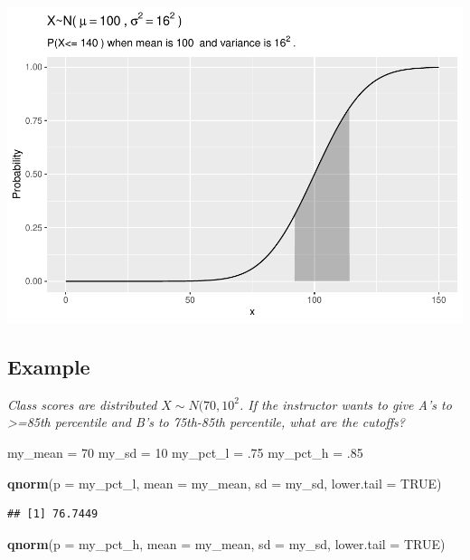 \documentclass[
]{book}
\newenvironment{Shaded}{\begin{snugshade}}{\end{snugshade}}
\newcommand{\DataTypeTok}[1]{\textcolor[rgb]{0.13,0.29,0.53}{#1}}
\newcommand{\DecValTok}[1]{\textcolor[rgb]{0.00,0.00,0.81}{#1}}
\newcommand{\FloatTok}[1]{\textcolor[rgb]{0.00,0.00,0.81}{#1}}
\newcommand{\KeywordTok}[1]{\textcolor[rgb]{0.13,0.29,0.53}{\textbf{#1}}}
\newcommand{\NormalTok}[1]{#1}
\newcommand{\OtherTok}[1]{\textcolor[rgb]{0.56,0.35,0.01}{#1}}
\newcommand{\StringTok}[1]{\textcolor[rgb]{0.31,0.60,0.02}{#1}}
\begin{document}
\includegraphics{data-sci_files/figure-latex/unnamed-chunk-15-1.pdf}

\hypertarget{example-3}{%
\subsection{Example}\label{example-3}}

\emph{Class scores are distributed }\(X \sim N(70, 10^2\)\emph{. If the instructor wants to give A's to \textgreater=85th percentile and B's to 75th-85th percentile, what are the cutoffs?}

\begin{Shaded}
\begin{Highlighting}[]
\NormalTok{my_mean =}\StringTok{ }\DecValTok{70}
\NormalTok{my_sd =}\StringTok{ }\DecValTok{10}
\NormalTok{my_pct_l =}\StringTok{ }\FloatTok{.75}
\NormalTok{my_pct_h =}\StringTok{ }\FloatTok{.85}

\KeywordTok{qnorm}\NormalTok{(}\DataTypeTok{p =}\NormalTok{ my_pct_l, }\DataTypeTok{mean =}\NormalTok{ my_mean, }\DataTypeTok{sd =}\NormalTok{ my_sd, }\DataTypeTok{lower.tail =} \OtherTok{TRUE}\NormalTok{)}
\end{Highlighting}
\end{Shaded}

\begin{verbatim}
## [1] 76.7449
\end{verbatim}

\begin{Shaded}
\begin{Highlighting}[]
\KeywordTok{qnorm}\NormalTok{(}\DataTypeTok{p =}\NormalTok{ my_pct_h, }\DataTypeTok{mean =}\NormalTok{ my_mean, }\DataTypeTok{sd =}\NormalTok{ my_sd, }\DataTypeTok{lower.tail =} \OtherTok{TRUE}\NormalTok{)}
\end{Highlighting}
\end{Shaded}
\end{document}
